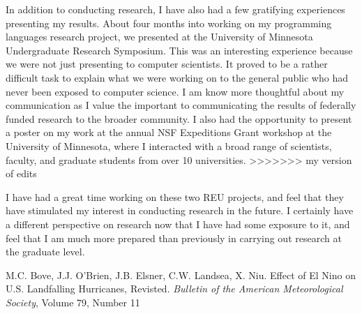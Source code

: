 \documentclass[a4paper,12pt]{article}
\begin{document}
In addition to conducting research, I have also had a few gratifying experiences presenting my results. About four months into working on my programming languages research project, we presented at the University of Minnesota Undergraduate Research Symposium. This was an interesting experience because we were not just presenting to computer scientists. It proved to be a rather difficult task to explain what we were working on to the general public who had never been exposed to computer science. I am know more thoughtful about my communication as I value the important to communicating the results of federally funded research to the broader community. I also had the opportunity to present a poster on my work at the annual NSF Expeditions Grant workshop at the University of Minnesota, where I interacted with a broad range of scientists, faculty, and graduate students from over 10 universities. 
>>>>>>> my version of edits

I have had a great time working on these two REU projects, and feel that they have stimulated my interest in conducting research in the future.  I certainly have a different perspective on research now that I have had some exposure to it, and feel that I am much more prepared than previously in carrying out research at the graduate level.  
\begin{thebibliography}{9} \vspace{-1ex}
\footnotesize
{}M.C. Bove, J.J. O'Brien, J.B. Elsner, C.W. Landsea, X. Niu.  Effect of El Nino on U.S. Landfalling Hurricanes, Revisted.  \textit{Bulletin of the American Meteorological Society}, Volume 79, Number 11
\end{thebibliography}
\end{document}
